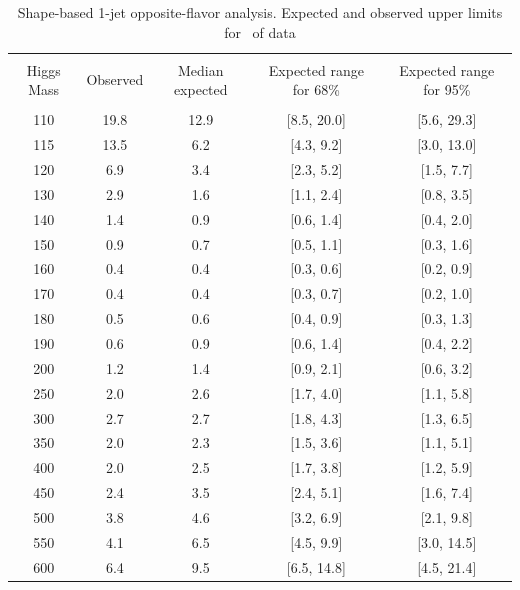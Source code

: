 \begin{table}[!hbp]
\begin{center}
\begin{tabular}{c c c c c}
\hline
\vspace{-3mm} && \\
 Higgs Mass   & Observed & Median expected & Expected range for 68\% & Expected range for 95\%   \\
\vspace{-3mm} && \\
\hline
110 & 19.8 & 12.9 & [8.5, 20.0] & [5.6, 29.3] \\
115 & 13.5 & 6.2 & [4.3, 9.2] & [3.0, 13.0] \\
120 & 6.9 & 3.4 & [2.3, 5.2] & [1.5, 7.7] \\
130 & 2.9 & 1.6 & [1.1, 2.4] & [0.8, 3.5] \\
140 & 1.4 & 0.9 & [0.6, 1.4] & [0.4, 2.0] \\
150 & 0.9 & 0.7 & [0.5, 1.1] & [0.3, 1.6] \\
160 & 0.4 & 0.4 & [0.3, 0.6] & [0.2, 0.9] \\
170 & 0.4 & 0.4 & [0.3, 0.7] & [0.2, 1.0] \\
180 & 0.5 & 0.6 & [0.4, 0.9] & [0.3, 1.3] \\
190 & 0.6 & 0.9 & [0.6, 1.4] & [0.4, 2.2] \\
200 & 1.2 & 1.4 & [0.9, 2.1] & [0.6, 3.2] \\
250 & 2.0 & 2.6 & [1.7, 4.0] & [1.1, 5.8] \\
300 & 2.7 & 2.7 & [1.8, 4.3] & [1.3, 6.5] \\
350 & 2.0 & 2.3 & [1.5, 3.6] & [1.1, 5.1] \\
400 & 2.0 & 2.5 & [1.7, 3.8] & [1.2, 5.9] \\
450 & 2.4 & 3.5 & [2.4, 5.1] & [1.6, 7.4] \\
500 & 3.8 & 4.6 & [3.2, 6.9] & [2.1, 9.8] \\
550 & 4.1 & 6.5 & [4.5, 9.9] & [3.0, 14.5] \\
600 & 6.4 & 9.5 & [6.5, 14.8] & [4.5, 21.4] \\
\hline
\end{tabular}
\caption{Shape-based 1-jet opposite-flavor analysis. Expected and observed
  upper limits for \intlumi\ of data}
\label{tab:of0_cut}
\end{center}
\end{table}
